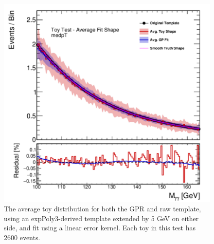 \begin{figure} 
\begin{center}
  \includegraphics[width=\textwidth]{figures/background/gpr/validation/linear/ToyTest_AvgFitShape_medpT_2600_noSig}   
\caption{The average toy distribution for both the GPR and raw template, using an expPoly3-derived template extended by 5 GeV on either side, and fit using a linear error kernel. Each toy in this test has 2600 events.}
\label{fig:linearkernel_medpt_2600_noSig}
\end{center}
\end{figure}

